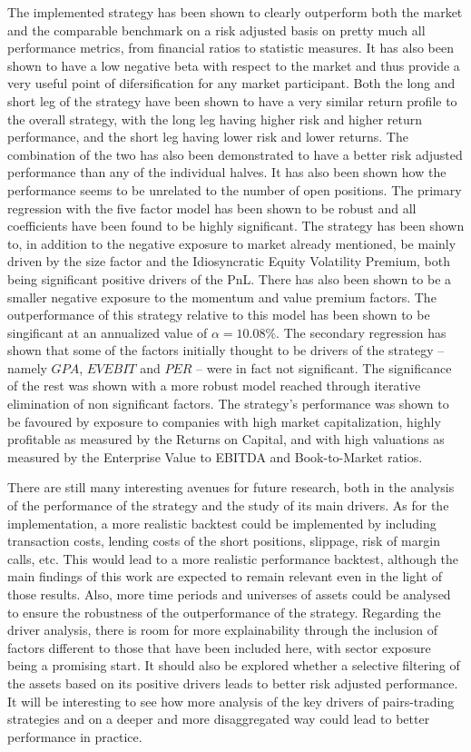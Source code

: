 The implemented strategy has been shown to clearly outperform both the market and the comparable benchmark on a risk adjusted basis on pretty much all performance metrics, from financial ratios to statistic measures. It has also been shown to have a low negative beta with respect to the market and thus provide a very useful point of difersification for any market participant. Both the long and short leg of the strategy have been shown to have a very similar return profile to the overall strategy, with the long leg having higher risk and higher return performance, and the short leg having lower risk and lower returns. The combination of the two has also been demonstrated to have a better risk adjusted performance than any of the individual halves. It has also been shown how the performance seems to be unrelated to the number of open positions. 
The primary regression with the five factor model has been shown to be robust and all coefficients have been found to be highly significant. The strategy has been shown to, in addition to the negative exposure to market already mentioned, be mainly driven by the size factor and the Idiosyncratic Equity Volatility Premium, both being significant positive drivers of the PnL. There has also been shown to be a smaller negative exposure to the momentum and value premium factors. The outperformance of this strategy relative to this model has been shown to be singificant at an annualized value of $\alpha=10.08\%$. 
The secondary regression has shown that some of the factors initially thought to be drivers of the strategy -- namely $GPA$, $EVEBIT$ and $PER$ -- were in fact not significant. The significance of the rest was shown with a more robust model reached through iterative elimination of non significant factors. The strategy's performance was shown to be favoured by exposure to companies with high market capitalization, highly profitable as measured by the Returns on Capital, and with high valuations as measured by the Enterprise Value to EBITDA and Book-to-Market ratios. 

There are still many interesting avenues for future research, both in the analysis of the performance of the strategy and the study of its main drivers. 
As for the implementation, a more realistic backtest could be implemented by including transaction costs, lending costs of the short positions, slippage, risk of margin calls, etc. This would lead to a more realistic performance backtest, although the main findings of this work are expected to remain relevant even in the light of those results. Also, more time periods and universes of assets could be analysed to ensure the robustness of the outperformance of the strategy.
Regarding the driver analysis, there is room for more explainability through the inclusion of factors different to those that have been included here, with sector exposure being a promising start. It should also be explored whether a selective filtering of the assets based on its positive drivers leads to better risk adjusted performance. It will be interesting to see how more analysis of the key drivers of pairs-trading strategies and on a deeper and more disaggregated way could lead to better performance in practice.